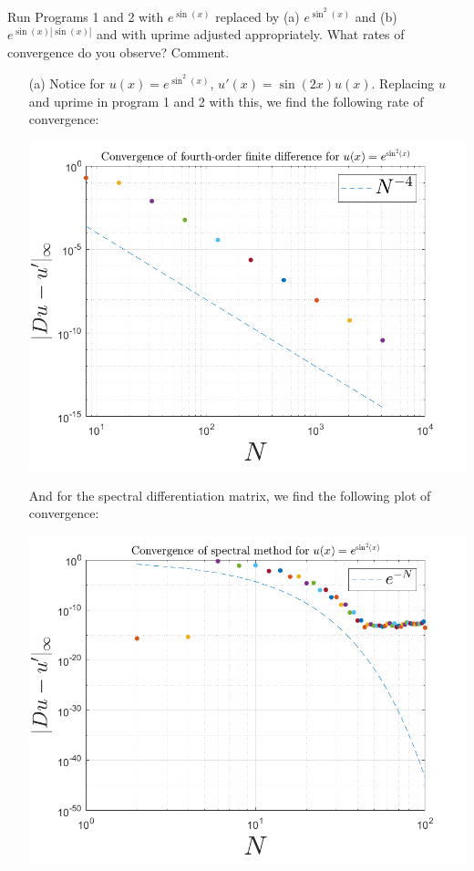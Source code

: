 \documentclass{article}
\begin{document}
Run Programs 1 and 2 with $e^{\sin(x)}$ replaced by (a) $e^{\sin^2(x)}$ and (b) $e^{\sin(x)|\sin(x)|}$ and with uprime adjusted appropriately. What rates of convergence do you observe? Comment.
\newline\newline
\begin{itemize}
    \item[(a)] Notice for $u(x) = e^{\sin^2(x)}$, $u'(x) = \sin(2x)u(x)$. Replacing $u$ and uprime in program 1 and 2 with this, we find the following rate of convergence: 
    \newline
    \begin{center}
        \includegraphics[scale =0.4]{expsin2.png}
    \end{center}
    And for the spectral differentiation matrix, we find the following plot of convergence:
    \begin{center}
        \includegraphics[scale = 0.4]{spectral expsin2 with exp.png}
    \end{center}


\end{itemize}
\end{document}
